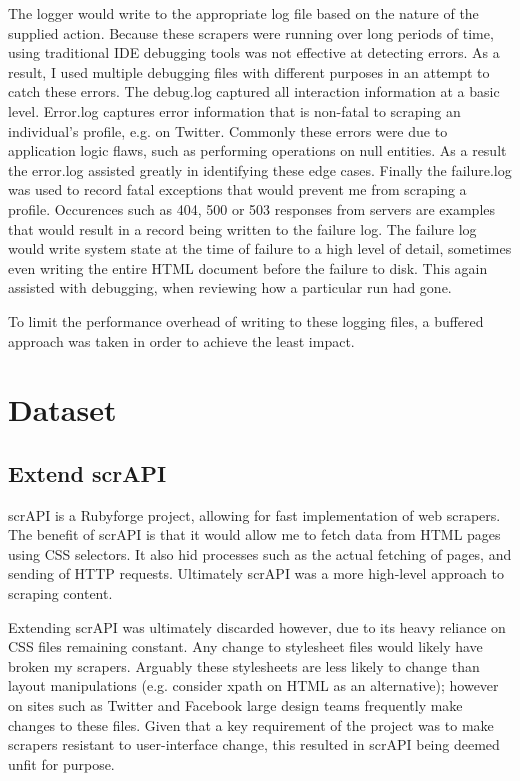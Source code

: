 The logger would write to the appropriate log file based on the nature of the supplied action. Because these scrapers were running over long periods of time, using traditional IDE debugging tools was not effective at detecting errors. As a result, I used multiple debugging files with different purposes in an attempt to catch these errors. The debug.log captured all interaction information at a basic level. Error.log captures error information that is non-fatal to scraping an individual's profile, e.g. on Twitter. Commonly these errors were due to application logic flaws, such as performing operations on null entities. As a result the error.log assisted greatly in identifying these edge cases. Finally the failure.log was used to record fatal exceptions that would prevent me from scraping a profile. Occurences such as 404, 500 or 503 responses from servers are examples that would result in a record being written to the failure log. The failure log would write system state at the time of failure to a high level 
of detail, sometimes even writing the entire HTML document before the failure to disk. This again assisted with debugging, when reviewing how a particular run had gone. 

To limit the performance overhead of writing to these logging files, a buffered approach was taken in order to achieve the least impact. %

\section{Dataset} %

\subsection{Extend scrAPI}

scrAPI is a Rubyforge project, allowing for fast implementation of web scrapers. The benefit of scrAPI is that it would allow me to fetch data from HTML pages using CSS selectors. It also hid processes such as the actual fetching of pages, and sending of HTTP requests. Ultimately scrAPI was a more high-level approach to scraping content.

Extending scrAPI was ultimately discarded however, due to its heavy reliance on CSS files remaining constant. Any change to stylesheet files would likely have broken my scrapers. Arguably these stylesheets are less likely to change than layout manipulations (e.g. consider xpath on HTML as an alternative); however on sites such as Twitter and Facebook large design teams frequently make changes to these files. Given that a key requirement of the project was to make scrapers resistant to user-interface change, this resulted in scrAPI being deemed unfit for purpose. 

